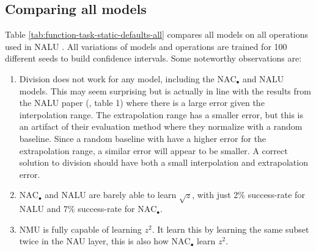 \subsection{Comparing all models}
\label{sec:appendix:comparison-all-models}

Table \ref{tab:function-task-static-defaults-all} compares all models on all operations used in NALU \cite{trask-nalu}. All variations of models and operations are trained for 100 different seeds to build confidence intervals. Some noteworthy observations are:

\begin{enumerate}
    \item Division does not work for any model, including the $\mathrm{NAC}_{\bullet}$ and NALU models. This may seem surprising but is actually in line with the results from the NALU paper (\citet{trask-nalu}, table 1) where there is a large error given the interpolation range. The extrapolation range has a smaller error, but this is an artifact of their evaluation method where they normalize with a random baseline. Since a random baseline with have a higher error for the extrapolation range, a similar error will appear to be smaller. A correct solution to division should have both a small interpolation and extrapolation error.
    \item $\mathrm{NAC}_{\bullet}$ and NALU are barely able to learn $\sqrt{z}$, with just 2\% success-rate for NALU and 7\% success-rate for $\mathrm{NAC}_{\bullet}$.
    \item NMU is fully capable of learning $z^2$. It learn this by learning the same subset twice in the NAU layer, this is also how $\mathrm{NAC}_{\bullet}$ learn $z^2$.
\end{enumerate}

